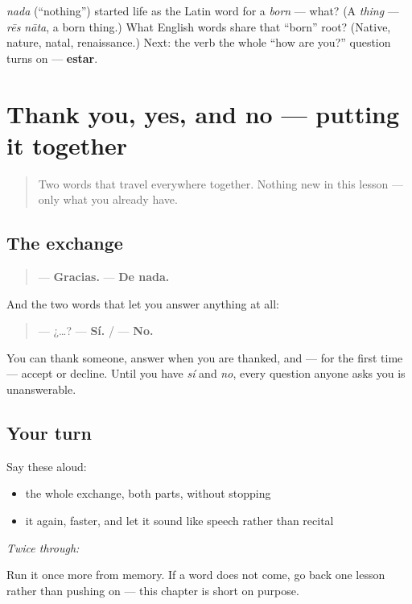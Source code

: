 \begin{tcolorbox}[breakable,colback=teal!4,colframe=teal!35!black,title={Before you move on}]
\emph{nada} (\textquotedblleft{}nothing\textquotedblright{}) started life as the Latin word for a \emph{born} — what? (A \emph{thing} — \emph{rēs nāta}, a born thing.) What English words share that \textquotedblleft{}born\textquotedblright{} root? (Native, nature, natal, renaissance.) Next: the verb the whole \textquotedblleft{}how are you?\textquotedblright{} question turns on — \textbf{estar}.
\end{tcolorbox}
\section[Practice]{Thank you, yes, and no — putting it together}

\label{lesson:ES-C04-repaso-gracias}



\begin{quote}
Two words that travel everywhere together. Nothing new in this lesson — only what you already have.
\end{quote}

\subsection*{The exchange}
\begin{quote}
— \textbf{Gracias.} — \textbf{De nada.}
\end{quote}

And the two words that let you answer anything at all:

\begin{quote}
— ¿…? — \textbf{Sí.}   /   — \textbf{No.}
\end{quote}

\begin{grammarlens}[title={What you've built}]
You can thank someone, answer when you are thanked, and — for the first time — accept or decline. Until you have \emph{sí} and \emph{no}, every question anyone asks you is unanswerable.
\end{grammarlens}

\subsection*{Your turn}
Say these aloud:

\begin{itemize}
\raggedright
  \item the whole exchange, both parts, without stopping
  \item it again, faster, and let it sound like speech rather than recital
\end{itemize}

\emph{Twice through:}

\begin{tcolorbox}[breakable,colback=teal!4,colframe=teal!35!black,title={Before you move on}]
Run it once more from memory. If a word does not come, go back one lesson rather than pushing on — this chapter is short on purpose.
\end{tcolorbox}
